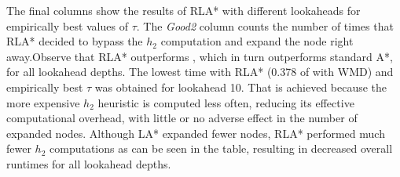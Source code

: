 The final columns show the results of RLA* with different lookaheads for
empirically best values of $\tau$. The {\em Good2} column counts the number of times that RLA* decided to bypass the $h_2$ computation and expand the node right away.Observe that RLA* outperforms \lazyastar, which in turn outperforms standard A*, for all lookahead depths. The lowest time with RLA* (0.378 of \astar with WMD) and empirically best $\tau$  was obtained for lookahead 10. That is achieved because the more expensive $h_2$ heuristic is computed less often, reducing its effective computational overhead, with little or no adverse effect in the number of expanded nodes. Although LA* expanded fewer nodes, RLA* performed much fewer $h_2$ computations as can be seen in the table, resulting in decreased overall runtimes for all lookahead depths.

